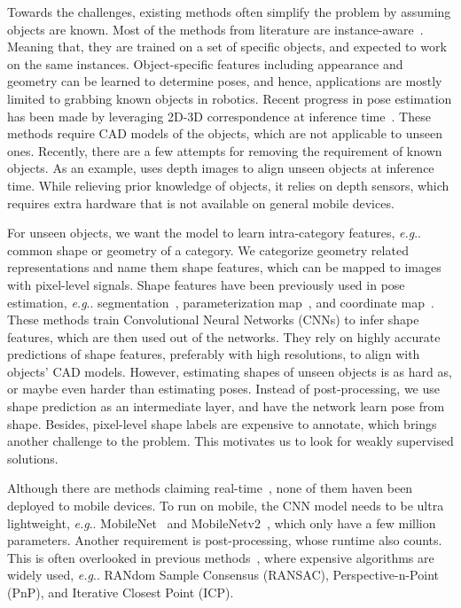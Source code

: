\documentclass[runningheads]{llncs}
\makeatletter
\DeclareRobustCommand\onedot{\futurelet\@let@token\@onedot}
\def\@onedot{\ifx\@let@token.\else.\null\fi\xspace}
\def\eg{\emph{e.g}\onedot} \def\Eg{\emph{E.g}\onedot}
\makeatother
\begin{document}
Towards the challenges, existing methods often simplify the problem by assuming objects are known. Most of the methods from literature are instance-aware~\cite{Kehl_2017_SSD6D,Xiang_2018_PoseCNN,Tekin_2018_SingleShot,Sundermeyer_2018_Implicit,Hu_2019_Segmentation}. Meaning that, they are trained on a set of specific objects, and expected to work on the same instances. Object-specific features including appearance and geometry can be learned to determine poses, and hence, applications are mostly limited to grabbing known objects in robotics. Recent progress in pose estimation has been made by leveraging 2D-3D correspondence at inference time~\cite{Li_2018_DeepIM,Zakharov_2019_DPOD,Peng_2019_PVNet,Li_2019_CDPN,Park_2019_Pix2Pose}. These methods require CAD models of the objects, which are not applicable to unseen ones. Recently, there are a few attempts for removing the requirement of known objects. As an example, \cite{Wang_2019_NOCS} uses depth images to align unseen objects at inference time. While relieving prior knowledge of objects, it relies on depth sensors, which requires extra hardware that is not available on general mobile devices.

For unseen objects, we want the model to learn intra-category features, \eg common shape or geometry of a category. We categorize geometry related representations and name them shape features, which can be mapped to images with pixel-level signals. Shape features have been previously used in pose estimation, \eg segmentation~\cite{Rad_2017_BB8,Hu_2019_Segmentation}, parameterization map~\cite{Zakharov_2019_DPOD}, and coordinate map~\cite{Wang_2019_NOCS,Li_2019_CDPN}. These methods train Convolutional Neural Networks (CNNs) to infer shape features, which are then used out of the networks. They rely on highly accurate predictions of shape features, preferably with high resolutions, to align with objects' CAD models. However, estimating shapes of unseen objects is as hard as, or maybe even harder than estimating poses. Instead of post-processing, we use shape prediction as an intermediate layer, and have the network learn pose from shape. Besides, pixel-level shape labels are expensive to annotate, which brings another challenge to the problem. This motivates us to look for weakly supervised solutions.

Although there are methods claiming real-time~\cite{Tekin_2018_SingleShot,Li_2019_CDPN}, none of them haven been deployed to mobile devices. To run on mobile, the CNN model needs to be ultra lightweight, \eg MobileNet~\cite{Howard_2017_MobileNets} and MobileNetv2~\cite{Sandler_2018_MobileNetv2}, which only have a few million parameters. Another requirement is post-processing, whose runtime also counts. This is often overlooked in previous methods~\cite{Peng_2019_PVNet,Zakharov_2019_DPOD,Li_2019_CDPN,Wang_2019_NOCS}, where expensive algorithms are widely used, \eg RANdom Sample Consensus (RANSAC), Perspective-n-Point (PnP), and Iterative Closest Point (ICP).
\end{document}
